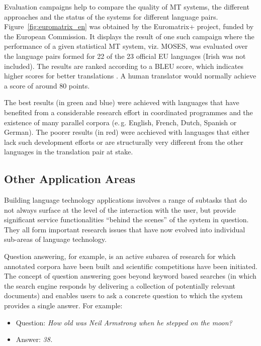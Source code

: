 \begin{multicols}{2}
Evaluation campaigns help to compare the quality of MT systems, the different approaches and the status of the systems for different language pairs. 
Figure~\ref{fig:euromatrix_en} was obtained by the Euromatrix+ project, funded by the European Commission.
It displays the result of one such campaign where the performance of a given statistical MT system, viz. MOSES, was evaluated over the language pairs formed for 22 of the 23 official EU languages (Irish was not included). 
The results are ranked according to a BLEU score, which indicates higher scores for better translations  \cite{bleu1}. A human translator would normally achieve a score of around 80 points.

The best results (in green and blue) were achieved with languages that have benefited from a considerable research effort in coordinated programmes and the existence of many parallel corpora (e.\,g. English, French, Dutch, Spanish or German). 
The poorer results (in red) were acchieved with languages that either lack such development efforts or are structurally very different from the other languages in the translation pair at stake.



\subsection{Other Application Areas}

Building language technology applications involves a range of subtasks that do not always surface at the level of the interaction with the user, 
but provide significant service functionalities “behind the scenes” of the system in question. 
They all form important research issues that have now evolved into individual sub-areas of language technology. 


 Question answering, for example, is an active subarea of research for which annotated corpora have been built and scientific competitions have been initiated. 
The concept of question answering goes beyond keyword based searches (in which the search engine responds by delivering a collection of potentially relevant documents) and enables users to ask a concrete question to which the system provides a single answer. For example:
\begin{itemize}
\item[] Question: \textit{How old was Neil Armstrong when he stepped on the moon?}
\item[] Answer: \textit{38.}
\end{itemize}


\end{multicols}
